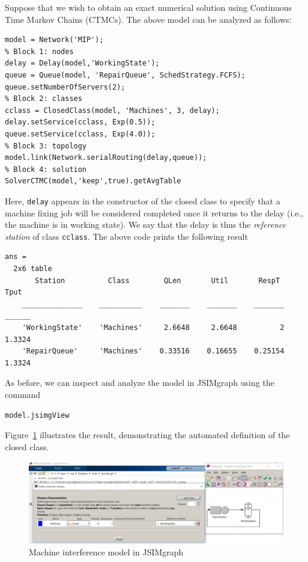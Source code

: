 Suppose that we wish to obtain an exact numerical solution using Continuous Time Markov Chains (CTMCs). The above model can be analyzed as follows:
\begin{lstlisting}
model = Network('MIP');
% Block 1: nodes
delay = Delay(model,'WorkingState');
queue = Queue(model, 'RepairQueue', SchedStrategy.FCFS);
queue.setNumberOfServers(2);
% Block 2: classes
cclass = ClosedClass(model, 'Machines', 3, delay);
delay.setService(cclass, Exp(0.5));
queue.setService(cclass, Exp(4.0));
% Block 3: topology
model.link(Network.serialRouting(delay,queue));
% Block 4: solution
SolverCTMC(model,'keep',true).getAvgTable
\end{lstlisting}
Here, \texttt{delay} appears in the constructor of the closed class to specify that a machine fixing job will be considered completed once it returns to the delay (i.e., the machine is in working state). We say that the delay is thus the \emph{reference station} of class \texttt{cclass}. The above code prints the following result
\begin{lstlisting}
ans =
  2x6 table
       Station          Class        QLen       Util       RespT      Tput
    ______________    __________    _______    _______    _______    ______
    'WorkingState'    'Machines'     2.6648     2.6648          2    1.3324
    'RepairQueue'     'Machines'    0.33516    0.16655    0.25154    1.3324
\end{lstlisting}
As before, we can inspect and analyze the model in JSIMgraph using the command
\begin{lstlisting}
model.jsimgView
\end{lstlisting}
Figure~\ref{FIG:jsimgViewFRP} illustrates the result, demonstrating the automated definition of the closed class.
\begin{figure}[h!t]
  \centering
  \includegraphics[width=14cm]{./images/jsimgViewFRP.png}
  \caption{Machine interference model in JSIMgraph}\label{FIG:jsimgViewFRP}
\end{figure}

